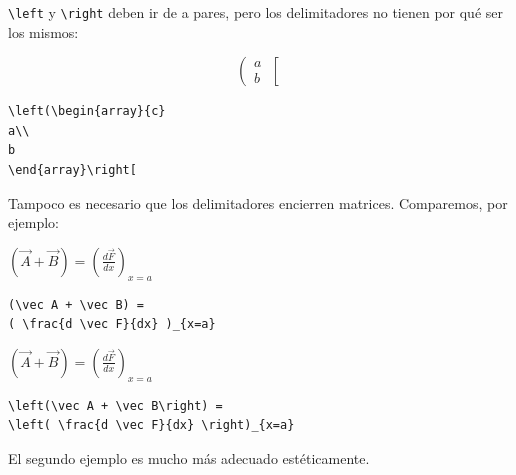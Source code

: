 \verb+\left+ y \verb+\right+ deben ir de a pares, pero los
delimitadores no tienen por qu{\'e} ser los mismos:

\vspace{.3cm}
{\small
\begin{minipage}[t]{5cm}
$$ 
\left(\begin{array}{c}
a\\
b
\end{array}\right[
$$
\end{minipage}
\hspace{2cm}
\begin{minipage}[t]{5cm}
\begin{verbatim}
\left(\begin{array}{c}
a\\
b
\end{array}\right[
\end{verbatim}
\end{minipage}
}
\vspace{.3cm}

Tampoco es necesario que los delimitadores encierren matrices.
Comparemos, por ejemplo:

\vspace{.3cm}
{\small
\begin{minipage}[t]{4cm}
$\displaystyle (\vec A + \vec B) = ( \frac{d \vec F}{dx} )_{x=a}$
\end{minipage}
\hspace{.5cm}
\begin{minipage}[t]{5cm}
\begin{verbatim}
(\vec A + \vec B) = 
( \frac{d \vec F}{dx} )_{x=a}
\end{verbatim}
\end{minipage}

\vspace{.5cm}
\begin{minipage}[t]{4cm}
$\displaystyle\left(\vec A + \vec B\right) = \left( \frac{d \vec F}{dx} \right)_{x=a}$
\end{minipage}
\hspace{.5cm}
\begin{minipage}[t]{5cm}
\begin{verbatim}
\left(\vec A + \vec B\right) = 
\left( \frac{d \vec F}{dx} \right)_{x=a}
\end{verbatim}
\end{minipage}
}
\vspace{.3cm}

El segundo ejemplo es mucho m{\'a}s adecuado est{\'e}ticamente. 

